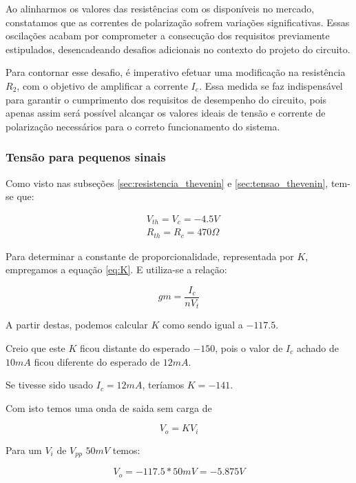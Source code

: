 Ao alinharmos os valores das resistências com os disponíveis no mercado, constatamos que as correntes de polarização sofrem variações significativas. Essas oscilações acabam por comprometer a consecução dos requisitos previamente estipulados, desencadeando desafios adicionais no contexto do projeto do circuito.

Para contornar esse desafio, é imperativo efetuar uma modificação na resistência $R_2$, com o objetivo de amplificar a corrente $I_e$. Essa medida se faz indispensável para garantir o cumprimento dos requisitos de desempenho do circuito, pois apenas assim será possível alcançar os valores ideais de tensão e corrente de polarização necessários para o correto funcionamento do sistema.

\subsubsection{Tensão para pequenos sinais}

Como visto nas subseções \ref{sec:resistencia_thevenin} e \ref{sec:tensao_thevenin}, tem-se que:


\begin{equation}
    \begin{aligned}
         & V_{th} = V_{c} = -4.5 V      \\
         & R_{th} = R_c = 470 \varOmega
    \end{aligned}
\end{equation}

Para determinar a constante de proporcionalidade, representada por $K$, empregamos a equação \ref{eq:K}. E utiliza-se a relação:

\begin{equation}
    gm = \frac{I_c}{n V_t}
\end{equation}

A partir destas, podemos calcular $K$ como sendo igual a $-117.5$.

Creio que este $K$ ficou distante do esperado $-150$, pois o valor de $I_c$ achado de $10mA$ ficou diferente do esperado de $12mA$.

Se tivesse sido usado $I_c = 12mA$, teríamos $K = -141$.

Com isto temos uma onda de saida sem carga de

\begin{equation}
    V_o = K V_i
\end{equation}

Para um $V_i$ de $V_{pp}$ $50mV$ temos:

\begin{equation}
    V_o = -117.5 * 50mV = -5.875V
\end{equation}
